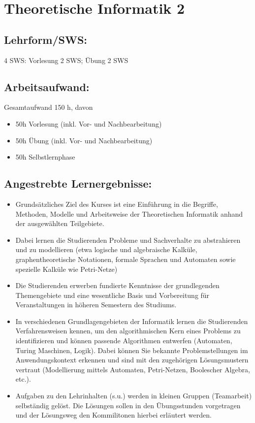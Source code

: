 \chapter{Theoretische Informatik 2}\label{theoretische-informatik-2}

\section*{Lehrform/SWS:}\label{lehrformsws-24}

4 SWS: Vorlesung 2 SWS; Übung 2 SWS

\section*{Arbeitsaufwand:}\label{arbeitsaufwand-20}

Gesamtaufwand 150 h, davon

\begin{itemize}
\item
  50h Vorlesung (inkl. Vor- und Nachbearbeitung)
\item
  50h Übung (inkl. Vor- und Nachbearbeitung)
\item
  50h Selbstlernphase
\end{itemize}

\section*{Angestrebte
Lernergebnisse:}\label{angestrebte-lernergebnisse-28}

\begin{itemize}
\item
  Grundsätzliches Ziel des Kurses ist eine Einführung in die Begriffe,
  Methoden, Modelle und Arbeitsweise der Theoretischen Informatik anhand
  der ausgewählten Teilgebiete.
\item
  Dabei lernen die Studierenden Probleme und Sachverhalte zu
  abstrahieren und zu modellieren (etwa logische und algebraische
  Kalküle, graphentheoretische Notationen, formale Sprachen und
  Automaten sowie spezielle Kalküle wie Petri-Netze)
\item
  Die Studierenden erwerben fundierte Kenntnisse der grundlegenden
  Themengebiete und eine wesentliche Basis und Vorbereitung für
  Veranstaltungen in höheren Semestern des Studiums.
\item
  In verschiedenen Grundlagengebieten der Informatik lernen die
  Studierenden Verfahrensweisen kennen, um den algorithmischen Kern
  eines Problems zu identifizieren und können passende Algorithmen
  entwerfen (Automaten, Turing Maschinen, Logik). Dabei können Sie
  bekannte Problemstellungen im Anwendungskontext erkennen und sind mit
  den zugehörigen Lösungsmustern vertraut (Modellierung mittels
  Automaten, Petri-Netzen, Boolescher Algebra, etc.).
\item
  Aufgaben zu den Lehrinhalten (s.u.) werden in kleinen Gruppen
  (Teamarbeit) selbständig gelöst. Die Lösungen sollen in den
  Übungsstunden vorgetragen und der Lösungsweg den Kommilitonen hierbei
  erläutert werden.
\end{itemize}

